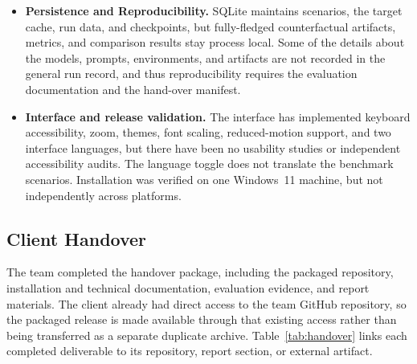 \documentclass[11pt,a4paper]{article}
\begin{document}
\begin{itemize}
  not bit-for-bit deterministic during local runs with the same seed, so paired
  same-job comparisons are provided but repeat-run variance is unknown.
  \item \textbf{Persistence and Reproducibility.} SQLite maintains scenarios, the
  target cache, run data, and checkpoints, but fully-fledged counterfactual artifacts,
  metrics, and comparison results stay process local. Some of the details about the
  models, prompts, environments, and artifacts are not recorded in the general run
  record, and thus reproducibility requires the evaluation documentation and the
  hand-over manifest.
  \item \textbf{Interface and release validation.} The interface has implemented
  keyboard accessibility, zoom, themes, font scaling, reduced-motion support, and two
  interface languages, but there have been no usability studies or independent
  accessibility audits. The language toggle does not translate the benchmark
  scenarios. Installation was verified on one Windows~11 machine, but not independently
  across platforms.
\end{itemize}

\subsection{Client Handover}

The team completed the handover package, including the packaged repository,
installation and technical documentation, evaluation evidence, and report materials.
The client already had direct access to the team GitHub repository, so the packaged
release is made available through that existing access rather than being transferred
as a separate duplicate archive. Table~\ref{tab:handover} links each completed
deliverable to its repository, report section, or external artifact.
\end{document}
